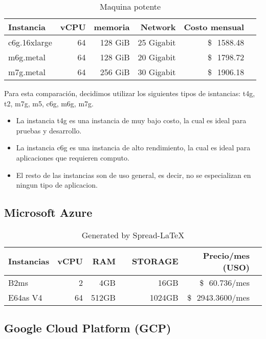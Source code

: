 \documentclass{article}
\newcommand{\usd}[1]{\SI{#1}[\$\ensuremath{\,}]{}}
\begin{document}
\begin{table}[!htp]\centering
\caption{Maquina potente}\label{tab:MV_Potente_AWS}
\scriptsize
\begin{tabular}{lrrrrr}\toprule
Instancia &vCPU &memoria &Network &Costo mensual\\\midrule
  c6g.16xlarge &64 &128 GiB &25 Gigabit & \usd{1588.48} \\
  m6g.metal &64 &128 GiB &20 Gigabit &\usd{1798.72} \\
  m7g.metal &64 &256 GiB &30 Gigabit &\usd{1906.18} \\
\bottomrule
\end{tabular}
\end{table}

Para esta comparación, decidimos utilizar los siguientes tipos de isntancias: t4g, t2, m7g, m5, c6g, m6g, m7g.
\begin{itemize}
  \item La instancia t4g es una instancia de muy bajo costo, la cual es ideal para pruebas y desarrollo.
  \item La instancia c6g es una instancia de alto rendimiento, la cual es ideal para aplicaciones que requieren computo.
  \item El resto de las instancias son de uso general, es decir, no se especializan en ningun tipo de aplicacion.
\end{itemize}
\newpage


  \subsection{Microsoft Azure}


  \begin{table}[!htp]\centering
\caption{Generated by Spread-LaTeX}\label{tab:MV_Azure}
\scriptsize
\begin{tabular}{lrrrrrr}\toprule
\cellcolor[HTML]{A8A8A8}Instancias &\cellcolor[HTML]{A8A8A8}vCPU &\cellcolor[HTML]{A8A8A8}RAM &\cellcolor[HTML]{A8A8A8} &\cellcolor[HTML]{A8A8A8}STORAGE &\cellcolor[HTML]{A8A8A8}Precio/mes (USO) \\\midrule
  \cellcolor[HTML]{A8A8A8}B2ms &2 &4GB & &16GB &\usd{60.736}/mes \\
  \cellcolor[HTML]{A8A8A8}E64as V4 &64 &512GB & &1024GB &\usd{2943.3600}/mes \\
\bottomrule
\end{tabular}
\end{table}

  \subsection{Google Cloud Platform (GCP)}
\end{document}
